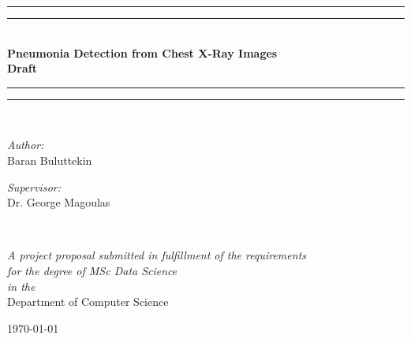 \documentclass[12pt, twoside, a4paper]{article}
\begin{document}
\begin{titlepage}
    \begin{center}
        \vspace*{.06\textheight}{\scshape\LARGE Birkbeck, University of London\par}\vspace{1.5cm} %
        \rule[0.5ex]{\linewidth}{2pt}\vspace*{-\baselineskip}\vspace*{3.2pt}
        \rule[0.5ex]{\linewidth}{1pt}\\[\baselineskip]
        \huge{\bfseries Pneumonia Detection from Chest X-Ray Images\\ Draft}\\[4mm]
        \rule[0.5ex]{\linewidth}{1pt}\vspace*{-\baselineskip}\vspace{3.2pt}
        \rule[0.5ex]{\linewidth}{2pt}\\
        [1.5cm]


        \begin{minipage}[t]{0.4\textwidth}
        \begin{flushleft} \large
        \emph{Author:}\\
        {Baran Buluttekin} %
        \end{flushleft}
        \end{minipage}
        \begin{minipage}[t]{0.4\textwidth}
        \begin{flushright} \large
        \emph{Supervisor:} \\
        {Dr. George Magoulas} %
        \end{flushright}
        \end{minipage}\\
        [3cm]

            \vfill

            \large \textit{A project proposal submitted in fulfillment of the requirements\\ for the degree of MSc Data Science}\\[0.3cm] %
            \textit{in the}\\[0.4cm]
            Department of Computer Science\\[2cm] %
 
            \vfill

            {\large \today}\\[4cm] %
 
            \vfill
    \end{center}
\end{titlepage}    
\thispagestyle{empty}
\cleardoublepage
\end{document}
